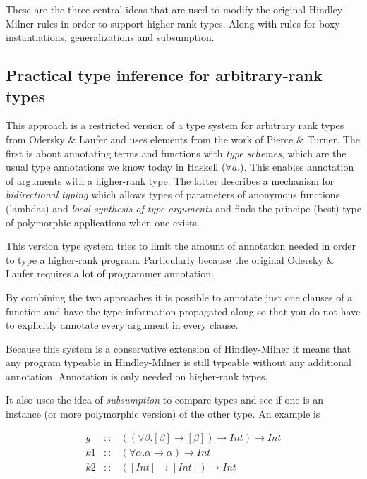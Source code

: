 \documentclass[twoside, titlepage, openright, a4paper]{book}
\begin{document}
These are the three central ideas that are used to modify the original Hindley-Milner rules in order to support higher-rank types. Along with rules for boxy instantiations, generalizations and subsumption.

\subsection{Practical type inference for arbitrary-rank types\cite{boring}}
This approach is a restricted version of a type system for arbitrary rank types from Odersky \& Laufer\cite{odesky} and uses elements from the work of Pierce \& Turner\cite{pierce}. The first is about annotating terms and functions with \textit{type schemes}, which are the usual type annotations we know today in Haskell ($\forall a.$). This enables annotation of arguments with a higher-rank type. The latter describes a mechanism for \textit{bidirectional typing} which allows types of parameters of anonymous functions (lambdas) and \textit{local synthesis of type arguments} and finds the principe (best) type of polymorphic applications when one exists.

This version type system tries to limit the amount of annotation needed in order to type a higher-rank program. Particularly because the original Odersky \& Laufer\cite{odesky} requires a lot of programmer annotation.

By combining the two approaches it is possible to annotate just one clauses of a function and have the type information propagated along so that you do not have to explicitly annotate every argument in every clause.

Because this system is a conservative extension of Hindley-Milner it means that any program typeable in Hindley-Milner is still typeable without any additional annotation. Annotation is only needed on higher-rank types.

It also uses the idea of \textit{subsumption} to compare types and see if one is an instance (or more polymorphic version) of the other type. An example is

\begin{eqnarray*}
g  &::& ((\forall\beta.[\beta] \rightarrow [\beta]) \rightarrow Int) \rightarrow Int \\
k1 &::& (\forall\alpha. \alpha \rightarrow \alpha) \rightarrow Int\\
k2 &::& ([Int] \rightarrow [Int]) \rightarrow Int
\end{eqnarray*}
\end{document}
